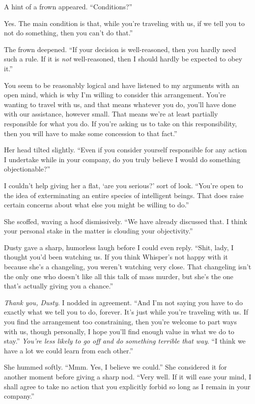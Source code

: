 A hint of a frown appeared. “Conditions?”

\leavevmode{}Yes. The main condition is that, while you’re traveling with us, if we tell you to not do something, then you can’t do that.”

The frown deepened. “If your decision is well-reasoned, then you hardly need such a rule. If it is \textit{not} well-reasoned, then I should hardly be expected to obey it.”

\leavevmode{}You seem to be reasonably logical and have listened to my arguments with an open mind, which is why I’m willing to consider this arrangement. You’re wanting to travel with us, and that means whatever you do, you’ll have done with our assistance, however small. That means we’re at least partially responsible for what you do. If you’re asking us to take on this responsibility, then you will have to make some concession to that fact.”

Her head tilted slightly. “Even if you consider yourself responsible for any action I undertake while in your company, do you truly believe I would do something objectionable?”

I couldn’t help giving her a flat, ‘are you serious?’ sort of look. “You’re open to the idea of exterminating an entire species of intelligent beings. That does raise certain concerns about what else you might be willing to do.”

She scoffed, waving a hoof dismissively. “We have already discussed that. I think your personal stake in the matter is clouding your objectivity.”

Dusty gave a sharp, humorless laugh before I could even reply. “Shit, lady, I thought you’d been watching us. If you think Whisper’s not happy with it because she’s a changeling, you weren’t watching very close. That changeling isn’t the only one who doesn’t like all this talk of mass murder, but she’s the one that’s actually giving you a chance.”

\textit{Thank you, Dusty}. I nodded in agreement. “And I’m not saying you have to do exactly what we tell you to do, forever. It’s just while you’re traveling with us. If you find the arrangement too constraining, then you’re welcome to part ways with us, though personally, I hope you’ll find enough value in what we do to stay.” \textit{You’re less likely to go off and do something terrible that way}. “I think we have a lot we could learn from each other.”

She hummed softly. “Mmm. Yes, I believe we could.” She considered it for another moment before giving a sharp nod. “Very well. If it will ease your mind, I shall agree to take no action that you explicitly forbid so long as I remain in your company.”

